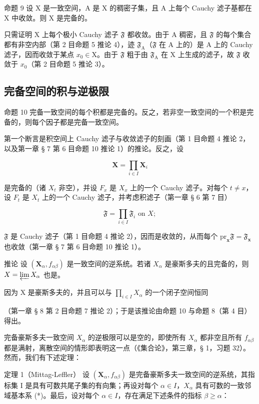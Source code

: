 命题 9 设 X 是一致空间，A 是 X 的稠密子集，且 A 上每个 Cauchy 滤子基都在 X 中收敛。则 X 是完备的。

只需证明 X 上每个极小 Cauchy 滤子 \(\mathfrak{F}\) 都收敛。由于 A 稠密，且 \(\mathfrak{F}\) 的每个集合都有非空内部（第 2 目命题 5 推论 4），迹 \(\mathfrak{F}_{\mathrm{A}}\)（\(\mathfrak{F}\) 在 A 上的）是 A 上的 Cauchy 滤子，因而收敛于某点 \(x_{0} \in \mathrm{X}\)。由于 \(\mathfrak{F}\) 粗于由 \(\mathfrak{F}_{\mathrm{A}}\) 在 X 上生成的滤子，故 \(\mathfrak{F}\) 收敛于 \(x_{0}\)（第 2 目命题 5 推论 3）。

\subsection{完备空间的积与逆极限}

命题 10 完备一致空间的每个积都是完备的。反之，若非空一致空间的一个积是完备的，则每个因子都是完备一致空间。

第一个断言是积空间上 Cauchy 滤子与收敛滤子的刻画（第 1 目命题 4 推论 2，以及第一章 § 7 第 6 目命题 10 推论 1）的推论。反之，设

\[
\mathbf {X} = \prod_ {i \in I} \mathbf {X} _ {i}
\]

是完备的（诸 \(X_{t}\) 非空），并设 \(F_{x}\) 是 \(X_{x}\) 上的一个 Cauchy 滤子。对每个 \(t \neq x\)，设 \(F_{t}\) 是 \(X_{t}\) 上的一个 Cauchy 滤子，并考虑积滤子（第一章 § 6 第 7 目）

\[
\mathfrak {F} = \prod_ {i \in I} \mathfrak {F} _ {i} \text { on } X;
\]

\(\mathfrak{F}\) 是 Cauchy 滤子（第 1 目命题 4 推论 2），因而是收敛的，从而每个 \(\mathrm{pr}_{\mathbf{x}}\mathfrak{F} = \mathfrak{F}_{\mathbf{x}}\) 也收敛（第一章 § 7 第 6 目命题 10 推论 1）。

推论 设 \((\mathbf{X}_{\alpha}, f_{\alpha\beta})\) 是一致空间的逆系统。若诸 \(X_{\alpha}\) 是豪斯多夫的且完备的，则 \(X = \varprojlim X_{\alpha}\) 也是。

因为 X 是豪斯多夫的，并且可以与 \(\prod_{i\in I}X_{\alpha}\) 的一个闭子空间恒同

（第一章 § 8 第 2 目命题 7 推论 2）；于是该推论由命题 10 与命题 8（第 4 目）得出。

完备豪斯多夫一致空间 \(X_{\alpha}\) 的逆极限可以是空的，即使所有 \(X_{\alpha}\) 都非空且所有 \(f_{\alpha\beta}\) 都是满射，离散空间的情形即表明这一点（《集合论》，第三章，§ 1，习题 32）。然而，我们有下述定理：

定理 1（Mittag-Leffler） 设 \((\mathbf{X}_{\alpha}, f_{\alpha\beta})\) 是完备豪斯多夫一致空间的逆系统，其指标集 I 是具有可数共尾子集的有向集；再设对每个 \(\alpha \in I\)，\(X_{\alpha}\) 具有可数的一致邻域基本系 (*)。最后，设对每个 \(\alpha \in I\)，存在满足下述条件的指标 \(\beta \geqslant \alpha\)：

